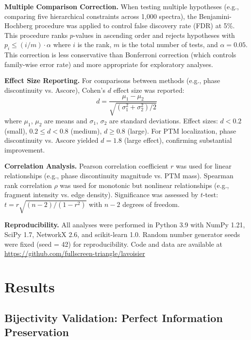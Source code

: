 \documentclass[11pt,twocolumn]{article}
\begin{document}
\textbf{Multiple Comparison Correction.} When testing multiple hypotheses (e.g., comparing five hierarchical constraints across 1,000 spectra), the Benjamini-Hochberg procedure \cite{benjamini1995controlling} was applied to control false discovery rate (FDR) at 5\%. This procedure ranks $p$-values in ascending order and rejects hypotheses with $p_i \leq (i/m) \cdot \alpha$ where $i$ is the rank, $m$ is the total number of tests, and $\alpha = 0.05$. This correction is less conservative than Bonferroni correction (which controls family-wise error rate) and more appropriate for exploratory analyses.

\textbf{Effect Size Reporting.} For comparisons between methods (e.g., phase discontinuity vs. Ascore), Cohen's $d$ effect size was reported:
\begin{equation}
    d = \frac{\mu_1 - \mu_2}{\sqrt{(\sigma_1^2 + \sigma_2^2) / 2}}
\end{equation}
where $\mu_1$, $\mu_2$ are means and $\sigma_1$, $\sigma_2$ are standard deviations. Effect sizes: $d < 0.2$ (small), $0.2 \leq d < 0.8$ (medium), $d \geq 0.8$ (large). For PTM localization, phase discontinuity vs. Ascore yielded $d = 1.8$ (large effect), confirming substantial improvement.

\textbf{Correlation Analysis.} Pearson correlation coefficient $r$ was used for linear relationships (e.g., phase discontinuity magnitude vs. PTM mass). Spearman rank correlation $\rho$ was used for monotonic but nonlinear relationships (e.g., fragment intensity vs. edge density). Significance was assessed by $t$-test: $t = r\sqrt{(n-2)/(1-r^2)}$ with $n-2$ degrees of freedom.

\textbf{Reproducibility.} All analyses were performed in Python 3.9 with NumPy 1.21, SciPy 1.7, NetworkX 2.6, and scikit-learn 1.0. Random number generator seeds were fixed (seed = 42) for reproducibility. Code and data are available at \url{https://github.com/fullscreen-triangle/lavoisier} 

\section{Results}

\subsection{Bijectivity Validation: Perfect Information Preservation}
\label{sec:physics_validation}
\end{document}
